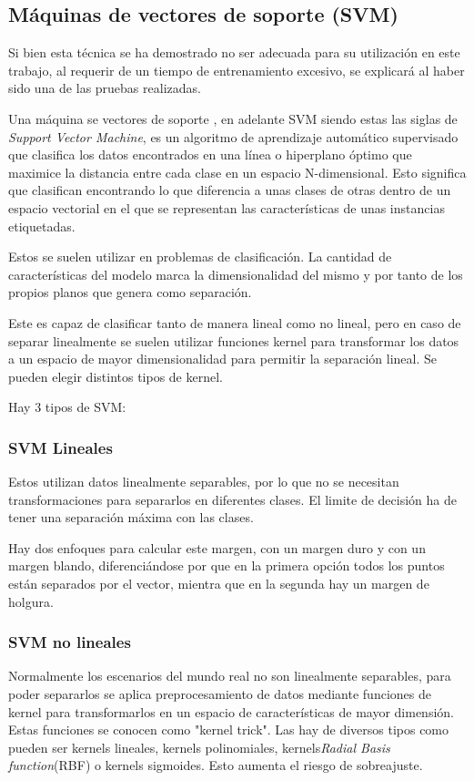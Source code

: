 \subsection{Máquinas de vectores de soporte (SVM)}

Si bien esta técnica se ha demostrado no ser adecuada para su utilización en este trabajo, al requerir de un tiempo de entrenamiento excesivo, se explicará al haber sido una de las pruebas realizadas.

Una máquina se vectores de soporte \cite{ibmWhatSupport}, en adelante SVM siendo estas las siglas de \textit{Support Vector Machine},  es un algoritmo de aprendizaje automático supervisado que clasifica los datos encontrados en una línea o hiperplano óptimo que maximice la distancia entre cada clase en un espacio N-dimensional. Esto significa que clasifican encontrando lo que diferencia a unas clases de otras dentro de un espacio vectorial en el que se representan las características de unas instancias etiquetadas.

Estos se suelen utilizar en problemas de clasificación. La cantidad de características del modelo marca la dimensionalidad del mismo y por tanto de los propios planos que genera como separación.

Este es capaz de clasificar tanto de manera lineal como no lineal, pero en caso de separar linealmente se suelen utilizar funciones kernel para transformar los datos a un espacio de mayor dimensionalidad para permitir la separación lineal. Se pueden elegir distintos tipos de kernel.

Hay 3 tipos de SVM:

\subsubsection{SVM Lineales}
Estos utilizan datos linealmente separables, por lo que no se necesitan transformaciones para separarlos en diferentes clases. El limite de decisión  ha de tener una separación máxima con las clases. 


Hay dos enfoques para calcular este margen, con un margen duro y con un margen blando, diferenciándose por que en la primera opción todos los puntos están separados por el vector, mientra que en la segunda hay un margen de holgura.

\subsubsection{SVM no lineales}
Normalmente los escenarios del mundo real no son linealmente separables, para poder separarlos se aplica preprocesamiento de datos mediante funciones de kernel para transformarlos en un espacio de características de mayor dimensión. Estas funciones se conocen como "kernel trick". Las hay de diversos tipos como pueden ser kernels lineales, kernels polinomiales, kernels\textit{Radial Basis function}(RBF) o kernels sigmoides. Esto aumenta el riesgo de sobreajuste.

